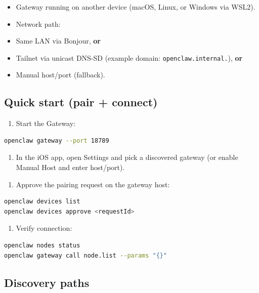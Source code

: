 \begin{itemize}
  \item Gateway running on another device (macOS, Linux, or Windows via WSL2).
  \item Network path:
  \item Same LAN via Bonjour, \textbf{or}
  \item Tailnet via unicast DNS-SD (example domain: \texttt{openclaw.internal.}), \textbf{or}
  \item Manual host/port (fallback).
\end{itemize}


\subsection{Quick start (pair + connect)}


\begin{enumerate}
  \item Start the Gateway:
\end{enumerate}


\begin{lstlisting}[language=bash]
openclaw gateway --port 18789
\end{lstlisting}


\begin{enumerate}
  \item In the iOS app, open Settings and pick a discovered gateway (or enable Manual Host and enter host/port).
\end{enumerate}


\begin{enumerate}
  \item Approve the pairing request on the gateway host:
\end{enumerate}


\begin{lstlisting}[language=bash]
openclaw devices list
openclaw devices approve <requestId>
\end{lstlisting}


\begin{enumerate}
  \item Verify connection:
\end{enumerate}


\begin{lstlisting}[language=bash]
openclaw nodes status
openclaw gateway call node.list --params "{}"
\end{lstlisting}


\subsection{Discovery paths}


